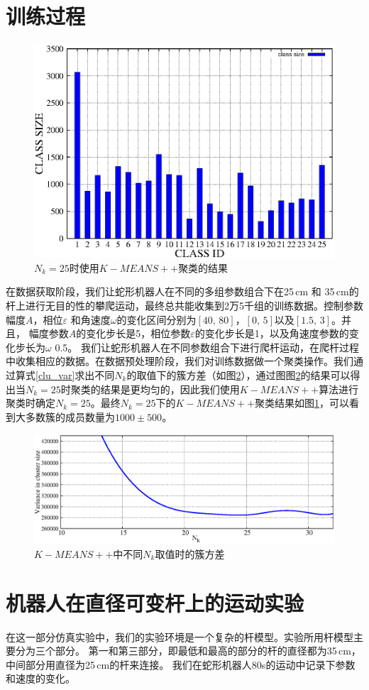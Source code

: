 \section{训练过程}
\begin{figure}[htbp]
	\centering
	\includegraphics[width=0.6\linewidth]{figure/chap05/cluster.eps}
	\caption{$N_{k}=25$时使用$K-MEANS++$聚类的结果}
	\label{fig:clustersize}
\end{figure}
在数据获取阶段，我们让蛇形机器人在不同的多组参数组合下在25\,cm 和 35\,cm的杆上进行无目的性的攀爬运动，最终总共能收集到2万5千组的训练数据。控制参数幅度$A$，相位$\varepsilon$ 和角速度$\omega$的变化区间分别为$[40, \, 80]$，$[0, \, 5]$以及$[1.5, \, 3]$。并且， 幅度参数$A$的变化步长是5，相位参数$\varepsilon$的变化步长是1，以及角速度参数的变化步长为$\omega$ 0.5。 我们让蛇形机器人在不同参数组合下进行爬杆运动，在爬杆过程中收集相应的数据。在数据预处理阶段，我们对训练数据做一个聚类操作。我们通过算式\ref{clu_var}求出不同$N_{k}$的取值下的簇方差（如图\ref{fig:clusize}），通过图图\ref{fig:clusize}的结果可以得出当$N_{k}=25$时聚类的结果是更均匀的，因此我们使用$K-MEANS++$算法进行聚类时确定$N_{k}=25$。最终$N_{k}=25$下的$K-MEANS++$聚类结果如图\ref{fig:clustersize}，可以看到大多数簇的成员数量为$1000 \pm 500 $。
\begin{figure}[htbp]
	\centering
	\includegraphics[width=0.9\linewidth,height=0.35\textheight]{figure/chap05/clusize.eps}
	\caption{$K-MEANS++$中不同$N_{k}$取值时的簇方差}
	\label{fig:clusize}
\end{figure}


\section{机器人在直径可变杆上的运动实验}
在这一部分仿真实验中，我们的实验环境是一个复杂的杆模型。实验所用杆模型主要分为三个部分。 第一和第三部分，即最低和最高的部分的杆的直径都为35\,cm，中间部分用直径为25\,cm的杆来连接。 我们在蛇形机器人80s的运动中记录下参数和速度的变化。

